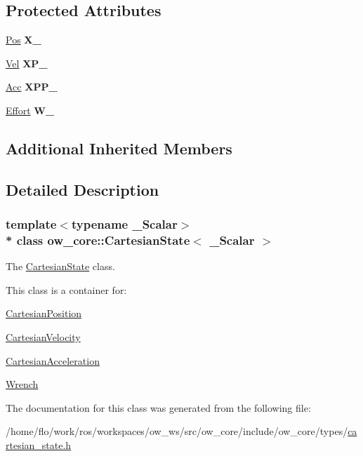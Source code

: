 \subsection*{Protected Attributes}
\begin{DoxyCompactItemize}
\item 
\hyperlink{classow__core_1_1CartesianPosition}{Pos} {\bfseries X\+\_\+}\hypertarget{classow__core_1_1CartesianState_afeee700935f8989cefcf71d65496a2fa}{}\label{classow__core_1_1CartesianState_afeee700935f8989cefcf71d65496a2fa}

\item 
\hyperlink{classow__core_1_1CartesianVelocity}{Vel} {\bfseries X\+P\+\_\+}\hypertarget{classow__core_1_1CartesianState_ac106f6588e71146d9baeafb1df563c26}{}\label{classow__core_1_1CartesianState_ac106f6588e71146d9baeafb1df563c26}

\item 
\hyperlink{classow__core_1_1CartesianAcceleration}{Acc} {\bfseries X\+P\+P\+\_\+}\hypertarget{classow__core_1_1CartesianState_ac32a67aff2ae2af04f5ae5883a43db94}{}\label{classow__core_1_1CartesianState_ac32a67aff2ae2af04f5ae5883a43db94}

\item 
\hyperlink{classow__core_1_1Wrench}{Effort} {\bfseries W\+\_\+}\hypertarget{classow__core_1_1CartesianState_af9e948b5817926fc4c6510ef78e1a1a6}{}\label{classow__core_1_1CartesianState_af9e948b5817926fc4c6510ef78e1a1a6}

\end{DoxyCompactItemize}
\subsection*{Additional Inherited Members}


\subsection{Detailed Description}
\subsubsection*{template$<$typename \+\_\+\+Scalar$>$\\*
class ow\+\_\+core\+::\+Cartesian\+State$<$ \+\_\+\+Scalar $>$}

The \hyperlink{classow__core_1_1CartesianState}{Cartesian\+State} class. 

This class is a container for\+:
\begin{DoxyItemize}
\item \hyperlink{classow__core_1_1CartesianPosition}{Cartesian\+Position}
\item \hyperlink{classow__core_1_1CartesianVelocity}{Cartesian\+Velocity}
\item \hyperlink{classow__core_1_1CartesianAcceleration}{Cartesian\+Acceleration}
\item \hyperlink{classow__core_1_1Wrench}{Wrench} 
\end{DoxyItemize}

The documentation for this class was generated from the following file\+:\begin{DoxyCompactItemize}
\item 
/home/flo/work/ros/workspaces/ow\+\_\+ws/src/ow\+\_\+core/include/ow\+\_\+core/types/\hyperlink{cartesian__state_8h}{cartesian\+\_\+state.\+h}\end{DoxyCompactItemize}
